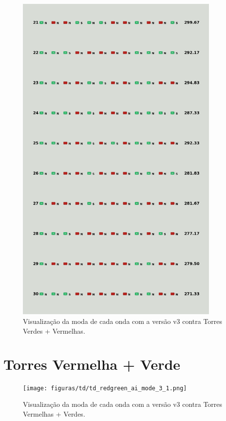 \begin{figure}[H]
  \centering
  \includegraphics[width=0.9\textwidth]{figuras/td/td_greenred_ai_mode_3_3.png}
  \caption{Visualização da moda de cada onda com a versão v3 contra Torres Verdes + Vermelhas.}
  \label{fig:td-moda-greenred-3-3}
\end{figure}

\section{Torres Vermelha + Verde}
\label{sec:apend-moda-td-rg-v3}

\begin{figure}[H]
  \centering
  \texttt{[image: figuras/td/td\_redgreen\_ai\_mode\_3\_1.png]}
  \caption{Visualização da moda de cada onda com a versão v3 contra Torres Vermelhas + Verdes.}
  \label{fig:td-moda-redgreen-3-1}
\end{figure}

